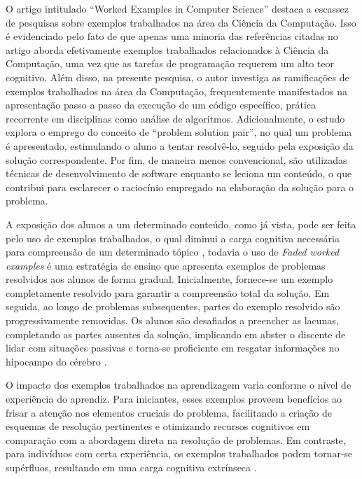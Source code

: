 O artigo intitulado ``Worked Examples in Computer Science'' \cite{Skudder-LuxtonReilly:2014} destaca a escassez de pesquisas sobre exemplos trabalhados na área da Ciência da Computação. Isso é evidenciado pelo fato de que apenas uma minoria das referências citadas no artigo aborda efetivamente exemplos trabalhados relacionados à Ciência da Computação, uma vez que as tarefas de programação requerem um alto teor cognitivo. Além disso, na presente pesquisa, o autor investiga as ramificações de exemplos trabalhados na área da Computação, frequentemente manifestados na apresentação passo a passo da execução de um código específico, prática recorrente em disciplinas como análise de algoritmos. Adicionalmente, o estudo explora o emprego do conceito de ``problem solution pair'', no qual um problema é apresentado, estimulando o aluno a tentar resolvê-lo, seguido pela exposição da solução correspondente. Por fim, de maneira menos convencional, são utilizadas técnicas de desenvolvimento de software enquanto se leciona um conteúdo, o que contribui para esclarecer o raciocínio empregado na elaboração da solução para o problema.

A exposição dos alunos a um determinado conteúdo, como já vista, pode ser feita pelo uso de exemplos trabalhados, o qual diminui a carga cognitiva necessária para compreensão de um determinado tópico \cite{Robert.Atkinson-etal:2000}, todavia o uso de \textit{Faded worked examples} é uma estratégia de ensino que apresenta exemplos de problemas resolvidos aos alunos de forma gradual. Inicialmente, fornece-se um exemplo completamente resolvido para garantir a compreensão total da solução. Em seguida, ao longo de problemas subsequentes, partes do exemplo resolvido são progressivamente removidas. Os alunos são desafiados a preencher as lacunas, completando as partes ausentes da solução, implicando em abster o discente de lidar com situações passivas e torna-se proficiente em resgatar informações no hipocampo do cérebro \cite{Skudder-LuxtonReilly:2014}.

O impacto dos exemplos trabalhados na aprendizagem varia conforme o nível de experiência do aprendiz. Para iniciantes, esses exemplos proveem benefícios ao frisar a atenção nos elementos cruciais do problema, facilitando a criação de esquemas de resolução pertinentes e otimizando recursos cognitivos em comparação com a abordagem direta na resolução de problemas. Em contraste, para indivíduos com certa experiência, os exemplos trabalhados podem tornar-se supérfluos, resultando em uma carga cognitiva extrínseca \cite{Skudder-LuxtonReilly:2014}.

